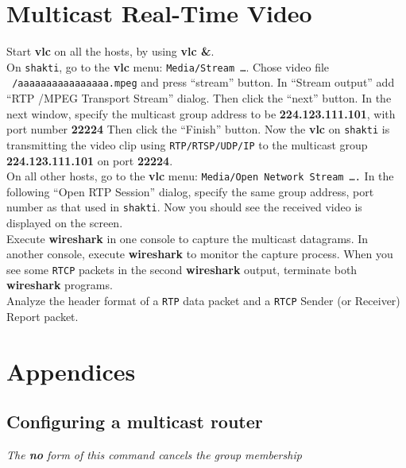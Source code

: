 \documentclass[10pt,a4paper]{article}
\numberwithin{equation}{section}
\numberwithin{figure}{section}
\numberwithin{table}{section}
\begin{document}
    \section{Multicast Real-Time Video}
    Start \textbf{vlc} on all the hosts, by using \textbf{vlc \&}. \\
    On \texttt{shakti}, go to the \textbf{vlc} menu: \texttt{Media/Stream \ldots }. Chose video file \texttt{~/aaaaaaaaaaaaaaaa.mpeg} and press “stream” button. In “Stream output” add “RTP /MPEG Transport Stream” dialog.
    Then click the “next” button.
    In the next window, specify the multicast group address to be \textbf{224.123.111.101}, with port number \textbf{22224} %
    Then click the “Finish” button.
    Now the \textbf{vlc} on \texttt{shakti} is transmitting the video clip using \texttt{RTP/RTSP/UDP/IP} to the multicast group \textbf{224.123.111.101} on port \textbf{22224}. \\
    On all other hosts, go to the \textbf{vlc} menu: \texttt{Media/Open Network Stream \ldots.} In the following “Open RTP Session” dialog, specify the same group address, port number as that used in \texttt{shakti}.%
    Now you should see the received video is displayed on the screen. \\
    Execute \textbf{wireshark} in one console to capture the multicast datagrams.
    In another console, execute \textbf{wireshark} to monitor the capture process.
    When you see some \texttt{RTCP} packets in the second \textbf{wireshark} output, terminate both \textbf{wireshark} programs. \\
    Analyze the header format of a \texttt{RTP} data packet and a \texttt{RTCP} Sender (or Receiver) Report packet.


    \appendix
\section*{Appendices}
\renewcommand{\thesubsection}{\Alph{subsection}}

\subsection{Configuring a multicast router}
\textit{The \textbf{no} form of this command cancels the group membership}
\end{document}
